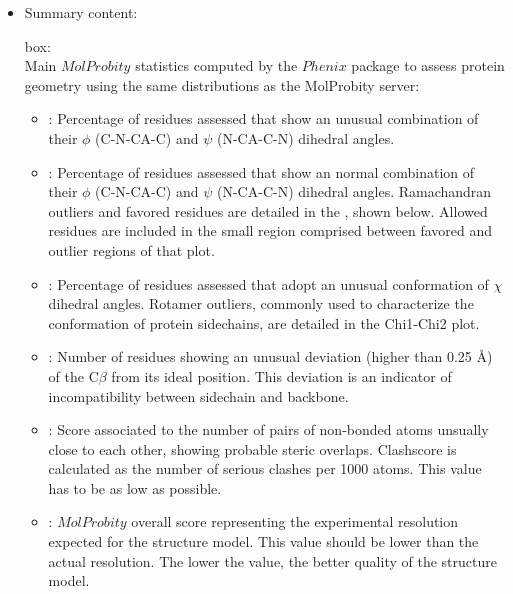 \begin{itemize}
 \item Summary content:
 
   box:\\Main $MolProbity$ statistics computed by the $Phenix$ package to assess protein geometry using the same distributions as the MolProbity server:
      \begin{itemize}     
        \item {}: Percentage of residues assessed that show an unusual combination of their $\phi$ (C-N-CA-C) and $\psi$ (N-CA-C-N) dihedral angles.
        \item {}: Percentage of residues assessed that show an normal combination of their $\phi$ (C-N-CA-C) and $\psi$ (N-CA-C-N) dihedral angles. Ramachandran outliers and favored residues are detailed in the , shown below. Allowed residues are included in the small region comprised between favored and outlier regions of that plot.
        \item {}: Percentage of residues assessed that adopt an unusual conformation of $\chi$ dihedral angles. Rotamer outliers, commonly used to characterize the conformation of protein sidechains, are detailed in the Chi1-Chi2 plot.
        \item {}: Number of residues showing an unusual deviation (higher than 0.25 \AA) of the C{$\beta$} from its ideal position. This deviation is an indicator of incompatibility between sidechain and backbone. 
        \item {}: Score associated to the number of pairs of non-bonded atoms unsually close to each other, showing probable steric overlaps. Clashscore is calculated as the number of serious clashes per 1000 atoms. This value has to be as low as possible.
        \item {}: $MolProbity$ overall score representing the experimental resolution expected for the structure model. This value should be lower than the actual resolution. The lower the value, the better quality of the structure model.
      \end{itemize}

\end{itemize}
